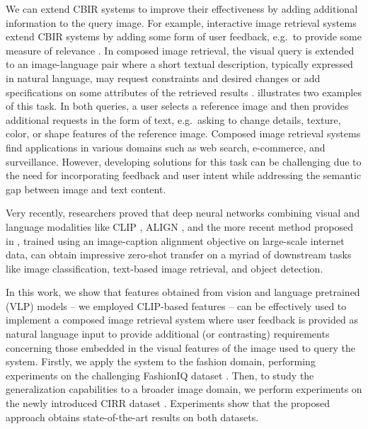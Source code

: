\documentclass[acmlarge]{acmart}
\begin{document}
We can extend CBIR systems to improve their effectiveness by adding additional information to the query image. For example, interactive image retrieval systems extend CBIR systems by adding some form of user feedback, e.g.~to provide some measure of relevance \cite{banerjee2018relevance}.
In composed image retrieval, the visual query is extended to an image-language pair \cite{liu2021image} where a short textual description, typically expressed in natural language, may request constraints and desired changes or add specifications on some attributes of the retrieved results \cite{Jandial_2022_WACV}.  illustrates two examples of this task. In both queries, a user selects a reference image and then provides additional requests in the form of text, e.g.~asking to change details, texture, color, or shape features of the reference image. 
Composed image retrieval systems find applications in various domains such as web search, e-commerce, and surveillance. However, developing solutions for this task can be challenging due to the need for incorporating feedback and user intent while addressing the semantic gap between image and text content.

Very recently, researchers proved that deep neural networks combining visual and language modalities like CLIP \cite{radford2021learning}, ALIGN \cite{jia2021scaling}, and the more recent method proposed in \cite{Cheng_2021_CVPR}, trained using an image-caption alignment objective on large-scale internet data, can obtain impressive zero-shot transfer on a myriad of downstream tasks like image classification, text-based image retrieval, and object detection.


In this work, we show that features obtained from vision and language pretrained (VLP) models -- we employed CLIP-based features -- can be effectively used to implement a composed image retrieval system where user feedback is provided as natural language input to provide additional (or contrasting) requirements concerning those embedded in the visual features of the image used to query the system.
Firstly, we apply the system to the fashion domain, performing experiments on the challenging FashionIQ dataset \cite{wu2021fashion}. Then, to study the generalization capabilities to a broader image domain, we perform experiments on the newly introduced CIRR dataset \cite{liu2021image}. Experiments show that the proposed approach obtains state-of-the-art results on both datasets.
\end{document}
